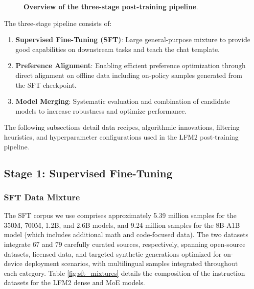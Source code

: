 \documentclass{article}
\begin{document}
\begin{figure}[htb]
    \caption{\textbf{Overview of the three-stage post-training pipeline}.}
    \label{fig:post-training-pipeline}
\end{figure}

The three-stage pipeline consists of:
\begin{enumerate}
    \item \textbf{Supervised Fine-Tuning (SFT)}: Large general-purpose mixture to provide good capabilities on downstream tasks and teach the chat template.
    \item \textbf{Preference Alignment}: Enabling efficient preference optimization through direct alignment on offline data including on-policy samples generated from the SFT checkpoint.
    \item \textbf{Model Merging}: Systematic evaluation and combination of candidate models to increase robustness and optimize performance.
\end{enumerate}

The following subsections detail data recipes, algorithmic innovations, filtering heuristics, and hyperparameter configurations used in the LFM2 post-training pipeline.

\subsection{Stage 1: Supervised Fine-Tuning}
\label{subsec:sft}

\subsubsection{SFT Data Mixture}

The SFT corpus we use comprises approximately 5.39 million samples for the 350M, 700M, 1.2B, and 2.6B models, and 9.24 million samples for the 8B-A1B model (which includes additional math and code-focused data). The two datasets integrate 67 and 79 carefully curated sources, respectively, spanning open-source datasets, licensed data, and targeted synthetic generations optimized for on-device deployment scenarios, with multilingual samples integrated throughout each category. Table \ref{fig:sft_mixtures} details the composition of the instruction datasets for the LFM2 dense and MoE models. 
\end{document}

